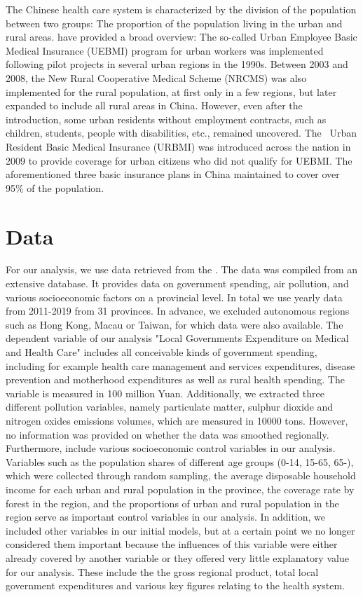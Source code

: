 \documentclass[
]{article}
\begin{document}
	The Chinese health care system is characterized by the division of the population between two groups: The proportion of the population living in the urban and rural areas.
	\cite{shi_health_2018} have provided a broad overview: The so-called Urban Employee Basic Medical Insurance (UEBMI) program for urban workers was implemented following pilot projects in several urban regions in the 1990s.
	Between 2003 and 2008, the New Rural Cooperative Medical Scheme (NRCMS) was also implemented for the rural population, at first only in a few regions, but later expanded to include all rural areas in China.
	However, even after the introduction, some urban residents without employment contracts, such as children, students, people with disabilities, etc., remained uncovered. The  Urban Resident Basic Medical Insurance (URBMI) was introduced across the nation in 2009 to provide coverage for urban citizens who did not qualify for UEBMI.
	The aforementioned three basic insurance plans in China maintained to cover over 95\% of the population.

	
	\section{Data} \label{Data}
	
	For our analysis, we use data retrieved from the \cite{NBSChina}. The data was compiled from an extensive database. It provides data on government spending, air pollution, and various socioeconomic factors on a provincial level. In total we use yearly data from 2011-2019 from 31 provinces. In advance, we excluded autonomous regions such as Hong Kong, Macau or Taiwan, for which data were also available. The dependent variable of our analysis "Local Governments Expenditure on Medical and Health Care" includes all conceivable kinds of government spending, including for example health care management and services expenditures, disease prevention and motherhood expenditures as well as rural health spending. The variable is measured in 100 million Yuan. Additionally, we extracted three different pollution variables, namely particulate matter, sulphur dioxide and nitrogen oxides emissions volumes, which are measured in 10000 tons. However, no information was provided on whether the data was smoothed regionally. Furthermore, include various socioeconomic control variables in our analysis. Variables such as the population shares of different age groups (0-14, 15-65, 65-), which were collected through random sampling, the average disposable household income for each urban and rural population in the province, the coverage rate by forest in the region, and the proportions of urban and rural population in the region serve as important control variables in our analysis. 
	In addition, we included other variables in our initial models, but at a certain point we no longer considered them important because the influences of this variable were either already covered by another variable or they offered very little explanatory value for our analysis. These include the the gross regional product, total local government expenditures and various key figures relating to the health system.
	
\end{document}

